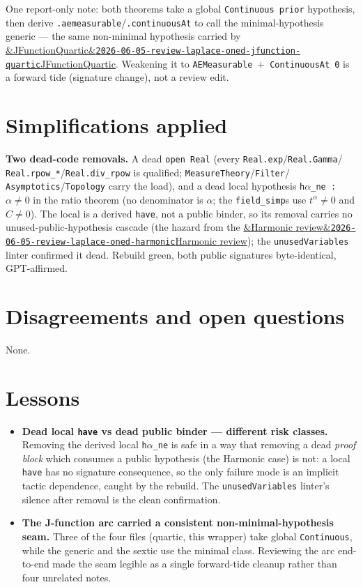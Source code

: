 \documentclass[11pt]{article}
\newcommand{\reviewref}[2][]{\href{https://therisensea.org/reviews/#2/}{\ifx&#1&\texttt{#2}\else#1\fi}}
\begin{document}
One report-only note: both theorems take a global \texttt{Continuous prior} hypothesis, then derive
\texttt{.aemeasurable}/\texttt{.continuousAt} to call the minimal-hypothesis generic --- the same non-minimal
hypothesis carried by \reviewref[JFunctionQuartic]{2026-06-05-review-laplace-oned-jfunction-quartic}. Weakening
it to \texttt{AEMeasurable}~$+$~\texttt{ContinuousAt 0} is a forward tide (signature change), not a review
edit.

\section{Simplifications applied}
\textbf{Two dead-code removals.} A dead \texttt{open Real} (every \texttt{Real.exp}/\texttt{Real.Gamma}/%
\texttt{Real.rpow\_*}/\texttt{Real.div\_rpow} is qualified; \texttt{MeasureTheory}/\texttt{Filter}/%
\texttt{Asymptotics}/\texttt{Topology} carry the load), and a dead local hypothesis \texttt{h$\alpha$\_ne :
$\alpha\ne0$} in the ratio theorem (no denominator is $\alpha$; the \texttt{field\_simp}s use $t^\alpha\ne0$
and $C\ne0$). The local is a derived \texttt{have}, not a public binder, so its removal carries no
unused-public-hypothesis cascade (the hazard from the
\reviewref[Harmonic review]{2026-06-05-review-laplace-oned-harmonic}); the \texttt{unusedVariables} linter
confirmed it dead. Rebuild green, both public signatures byte-identical, GPT-affirmed.

\section{Disagreements and open questions}
None.

\section{Lessons}
\begin{itemize}[noitemsep]
  \item \textbf{Dead local \texttt{have} vs dead public binder --- different risk classes.} Removing the
    derived local \texttt{h$\alpha$\_ne} is safe in a way that removing a dead \emph{proof block} which
    consumes a public hypothesis (the Harmonic case) is not: a local \texttt{have} has no signature
    consequence, so the only failure mode is an implicit tactic dependence, caught by the rebuild. The
    \texttt{unusedVariables} linter's silence after removal is the clean confirmation.
  \item \textbf{The J-function arc carried a consistent non-minimal-hypothesis seam.} Three of the four files
    (quartic, this wrapper) take global \texttt{Continuous}, while the generic and the sextic use the minimal
    class. Reviewing the arc end-to-end made the seam legible as a single forward-tide cleanup rather than four
    unrelated notes.
\end{itemize}
\end{document}

